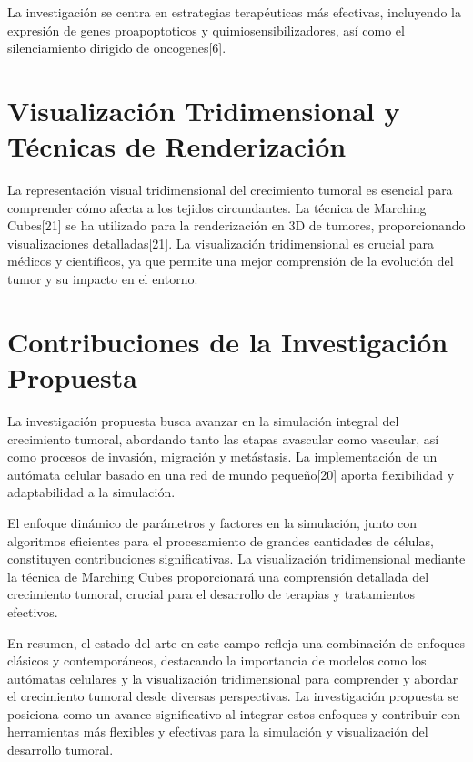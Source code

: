 La investigación se centra en estrategias terapéuticas más efectivas, incluyendo la expresión de genes proapoptoticos y quimiosensibilizadores, así como el silenciamiento dirigido de oncogenes[6].

\section{Visualización Tridimensional y Técnicas de Renderización}

La representación visual tridimensional del crecimiento tumoral es esencial para comprender cómo afecta a los tejidos circundantes. La técnica de Marching Cubes[21] se ha utilizado para la renderización en 3D de tumores, proporcionando visualizaciones detalladas[21]. La visualización tridimensional es crucial para médicos y científicos, ya que permite una mejor comprensión de la evolución del tumor y su impacto en el entorno.

\section{Contribuciones de la Investigación Propuesta}

La investigación propuesta busca avanzar en la simulación integral del crecimiento tumoral, abordando tanto las etapas avascular como vascular, así como procesos de invasión, migración y metástasis. La implementación de un autómata celular basado en una red de mundo pequeño[20] aporta flexibilidad y adaptabilidad a la simulación.

El enfoque dinámico de parámetros y factores en la simulación, junto con algoritmos eficientes para el procesamiento de grandes cantidades de células, constituyen contribuciones significativas. La visualización tridimensional mediante la técnica de Marching Cubes proporcionará una comprensión detallada del crecimiento tumoral, crucial para el desarrollo de terapias y tratamientos efectivos.

En resumen, el estado del arte en este campo refleja una combinación de enfoques clásicos y contemporáneos, destacando la importancia de modelos como los autómatas celulares y la visualización tridimensional para comprender y abordar el crecimiento tumoral desde diversas perspectivas. La investigación propuesta se posiciona como un avance significativo al integrar estos enfoques y contribuir con herramientas más flexibles y efectivas para la simulación y visualización del desarrollo tumoral.